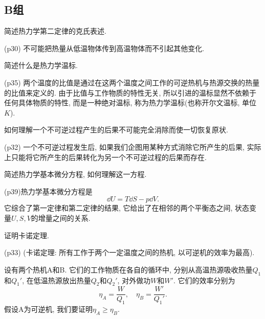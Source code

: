 \subsection{B组}
\begin{questions}
  \question 简述热力学第二定律的克氏表述.
  \begin{solution}
    (p30) 不可能把热量从低温物体传到高温物体而不引起其他变化.
  \end{solution}
  \question 简述什么是热力学温标.
  \begin{solution}
    (p35) 两个温度的比值是通过在这两个温度之间工作的可逆热机与热源交换的热量的比值来定义的. 由于比值与工作物质的特性无关, 所以引进的温标显然不依赖于任何具体物质的特性, 而是一种绝对温标, 称为热力学温标(也称开尔文温标, 单位 $\si{K}$).
  \end{solution}
  \question 如何理解一个不可逆过程产生的后果不可能完全消除而使一切恢复原状.
  \begin{solution}
    (p32) 一个不可逆过程发生后, 如果我们企图用某种方式消除它所产生的后果, 实际上只能将它所产生的后果转化为另一个不可逆过程的后果而存在.
  \end{solution}
  \question 简述热力学基本微分方程, 如何理解这一方程.
  \begin{solution}
    (p39)热力学基本微分方程是
    \begin{equation}
      \dd U = T\dd S - p\dd V.
    \end{equation}
    它综合了第一定律和第二定律的结果, 它给出了在相邻的两个平衡态之间, 状态变量$U, S, V$的增量之间的关系.
  \end{solution}
  \question 证明卡诺定理.
  \begin{solution}
    (p33) (卡诺定理: 所有工作于两个一定温度之间的热机, 以可逆机的效率为最高).

    设有两个热机A和B. 它们的工作物质在各自的循环中, 分别从高温热源吸收热量$Q_1$和$Q_1'$, 在低温热源放出热量$Q_2$和$Q_2'$, 对外做功$W$和$W'$. 它们的效率分别为
    \begin{equation}
      \eta_A = \frac{W}{Q_1}, \quad \eta_B = \frac{W'}{Q_1'}.
    \end{equation}
    假设A为可逆机, 我们要证明$\eta_A\ge\eta_B$.


\end{solution}
\end{questions}
